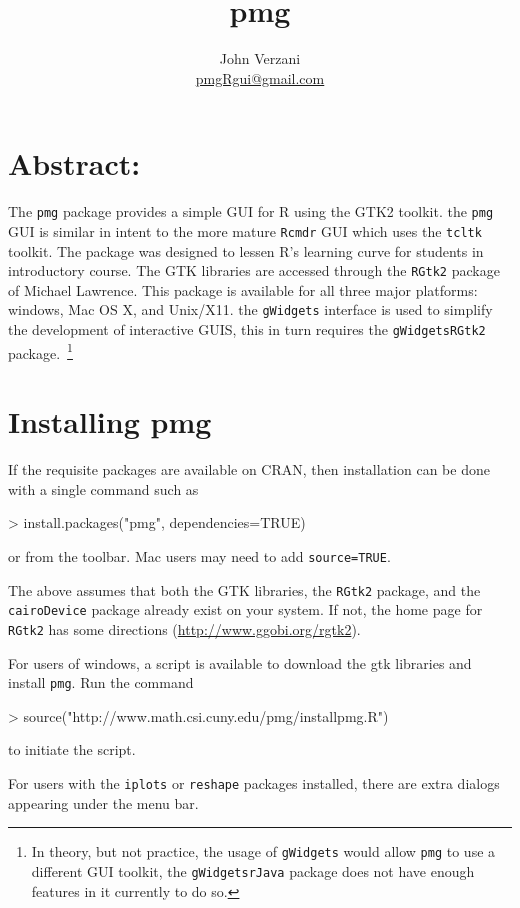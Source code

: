 \documentclass[12pt]{article}
\newcommand{\RCode}[1]{\texttt{#1}}
\begin{document}
\title{pmg}
\author{John Verzani\\\url{pmgRgui@gmail.com}}
\maketitle

\section*{Abstract:}

The \RCode{pmg} package provides a simple GUI for R using the GTK2
toolkit. the \RCode{pmg} GUI is similar in intent to the more mature
\RCode{Rcmdr} GUI which uses the \RCode{tcltk} toolkit. The package
was designed to lessen R's learning curve for students in introductory
course. The GTK libraries are accessed through the \RCode{RGtk2}
package of Michael Lawrence. This package is available for all three
major platforms: windows, Mac OS X, and Unix/X11.  the
\RCode{gWidgets} interface is used to simplify the development of
interactive GUIS, this in turn requires the \RCode{gWidgetsRGtk2}
package.~\footnote{In theory, but not practice, the usage of
  \RCode{gWidgets} would allow \RCode{pmg} to use a different GUI
  toolkit, the \RCode{gWidgetsrJava} package does not have enough
  features in it currently to do so.}


\section{Installing pmg}
If the requisite packages are available on CRAN, then installation can
be done with a single command such as
\begin{Soutput}
> install.packages("pmg", dependencies=TRUE)
\end{Soutput}
or from the toolbar. Mac users may need to add \RCode{source=TRUE}.


The above assumes that both the GTK libraries, the \RCode{RGtk2}
package, and the \RCode{cairoDevice} package already exist on your
system. If not, the home page for \RCode{RGtk2} has some directions
(\url{http://www.ggobi.org/rgtk2}).

For users of windows, a script is available to download the gtk
libraries and install \RCode{pmg}. Run the command
\begin{Sinput}
> source("http://www.math.csi.cuny.edu/pmg/installpmg.R")
\end{Sinput}
to initiate the script.

For users with the \RCode{iplots} or \RCode{reshape} packages
installed, there are extra dialogs appearing under the menu bar.
\end{document}
